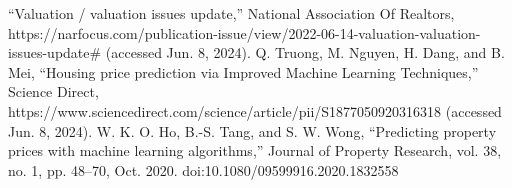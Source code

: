 \documentclass[conference, 11pt]{IEEEtran}
\begin{document}
\begin{thebibliography}{00}
 “Valuation / valuation issues update,” National Association Of Realtors, https://narfocus.com/publication-issue/view/2022-06-14-valuation-valuation-issues-update# (accessed Jun. 8, 2024).
 Q. Truong, M. Nguyen, H. Dang, and B. Mei, “Housing price prediction via Improved Machine Learning Techniques,” Science Direct, https://www.sciencedirect.com/science/article/pii/S1877050920316318 (accessed Jun. 8, 2024).
 W. K. O. Ho, B.-S. Tang, and S. W. Wong, “Predicting property prices with machine learning algorithms,” Journal of Property Research, vol. 38, no. 1, pp. 48–70, Oct. 2020. doi:10.1080/09599916.2020.1832558
\end{thebibliography}
\vspace{12pt}
\end{document}
